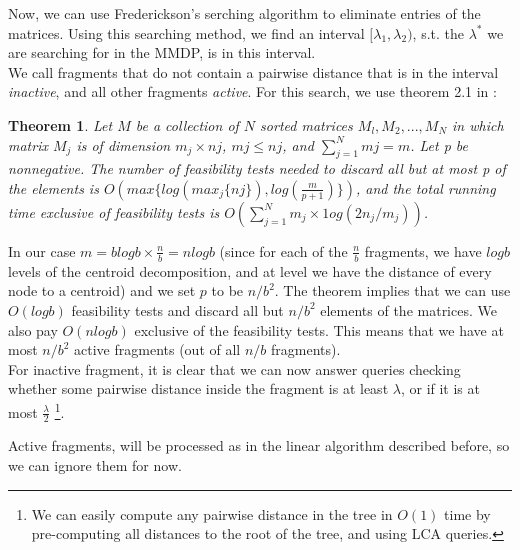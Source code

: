 \documentclass[11pt,a4paper]{article}
\newtheorem{theorem}{Theorem}[section]
\theoremstyle{definition}
\theoremstyle{remark}
\begin{document}
Now, we can use Frederickson's serching algorithm to eliminate entries of the matrices. Using this searching method, we find an interval $[\lambda_1,\lambda_2)$, s.t. the $\lambda^*$ we are searching for in the MMDP, is in this interval.\\
We call fragments that do not contain a pairwise distance that is in the interval \textit{inactive}, and all other fragments \textit{active}.
For this search, we use theorem 2.1 in \cite{Frederickson1991}:
\begin{theorem}
Let $M$ be a collection of $N$ sorted matrices ${M_l, M_2, . . . , M_N}$ in which matrix $M_j$ is of dimension $m_j \times nj$, $mj \leq nj$, and $\sum_{j=1}^{N} mj = m$.
Let p be nonnegative. The number of feasibility tests needed to discard all but at most p of the elements is $O(max \lbrace log (max_j \lbrace nj \rbrace), log(\frac{m}{p+1}) \rbrace )$, and the total running time exclusive of feasibility tests is $O(\sum_{j=1}^{N} m_j \times 1og(2n_j/m_j))$.
\end{theorem}
In our case $m=blogb \times \frac{n}{b} = nlogb$ (since for each of the $\frac{n}{b}$ fragments, we have $logb$ levels of the centroid decomposition, and at level we have the distance of every node to a centroid) and we set $p$ to be $n/b^2$. The theorem implies that we can use $O(logb)$ feasibility tests and discard all but $n/b^2$ elements of the matrices. We also pay $O(nlogb)$ exclusive of the feasibility tests. This means that we have at most $n/b^2$ active fragments (out of all $n/b$ fragments). \\
For inactive fragment, it is clear that we can now answer queries checking whether some pairwise distance inside the fragment is at least $\lambda$, or if it is at most $\frac{\lambda}{2}$ \footnote{We can easily compute any pairwise distance in the tree in $O(1)$ time by pre-computing all distances to the root of the tree, and using LCA queries.}.

Active fragments, will be processed as in the linear algorithm described before, so we can ignore them for now.
\end{document}

